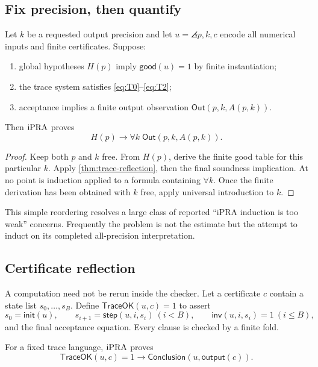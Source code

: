 \subsection{Fix precision, then quantify}

\begin{theorem}
\label{thm:fixed-precision}
Let \(k\) be a requested output precision and let \(u=\angles{p,k,c}\) encode
all numerical inputs and finite certificates.  Suppose:
\begin{enumerate}
\item global hypotheses \(H(p)\) imply \(\mathsf{good}(u)=1\) by finite
      instantiation;
\item the trace system satisfies \eqref{eq:T0}--\eqref{eq:T2};
\item acceptance implies a finite output observation
      \(\mathsf{Out}(p,k,A(p,k))\).
\end{enumerate}
Then \(\mathrm{iPRA}\) proves
\[
 H(p)\to\forall k\;\mathsf{Out}(p,k,A(p,k)).
\]
\end{theorem}

\begin{proof}
Keep both \(p\) and \(k\) free.  From \(H(p)\), derive the finite good table
for this particular \(k\).  Apply \cref{thm:trace-reflection}, then the final
soundness implication.  At no point is induction applied to a formula
containing \(\forall k\).  Once the finite derivation has been obtained with
\(k\) free, apply universal introduction to \(k\).
\end{proof}

This simple reordering resolves a large class of reported ``iPRA induction is
too weak'' concerns.  Frequently the problem is not the estimate but the
attempt to induct on its completed all-precision interpretation.

\subsection{Certificate reflection}

A computation need not be rerun inside the checker.  Let a certificate
\(c\) contain a state list \(s_0,\ldots,s_B\).  Define
\(\mathsf{TraceOK}(u,c)=1\) to assert
\[
 s_0=\mathsf{init}(u),\qquad
 s_{i+1}=\mathsf{step}(u,i,s_i)\ (i<B),\qquad
 \mathsf{inv}(u,i,s_i)=1\ (i\le B),
\]
and the final acceptance equation.  Every clause is checked by a finite fold.

\begin{corollary}
\label{cor:certificate-checker}
For a fixed trace language, \(\mathrm{iPRA}\) proves
\[
 \mathsf{TraceOK}(u,c)=1\to\mathsf{Conclusion}(u,\mathsf{output}(c)).
\]
\end{corollary}

